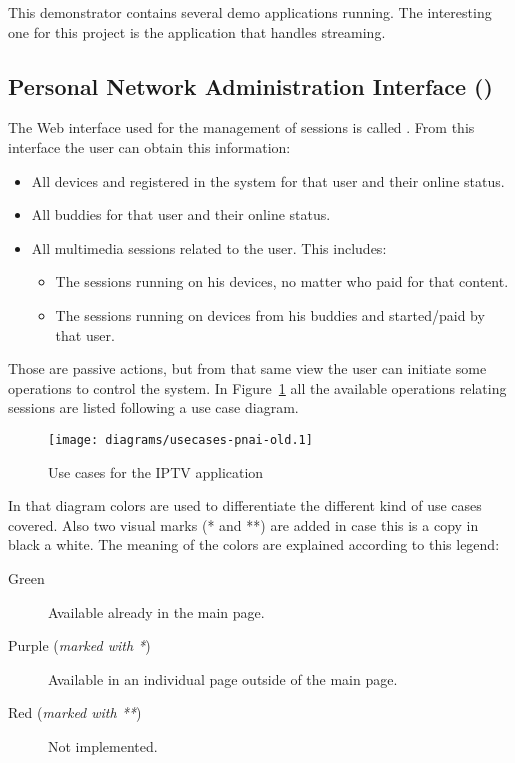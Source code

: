 This demonstrator contains several demo applications running.
The interesting one for this project is the application that handles  streaming.


\subsection{Personal Network Administration Interface ()} %
\label{sub:pnai}

The Web interface used for the management of sessions is called . From this interface the user can obtain this information:

\begin{itemize}
  \item All devices and registered in the system for that user and their online status.
  \item All buddies for that user and their online status.
  \item All multimedia sessions related to the user. This includes:
  \begin{itemize}
    \item The sessions running on his devices, no matter who paid for that content.
    \item The sessions running on devices from his buddies and started/paid by that user.
  \end{itemize}
\end{itemize}

Those are passive actions, but from that same view the user can initiate some operations to control the system.
In Figure~\ref{fig:usecasesiptv} all the available operations relating sessions are listed following a use case diagram.

\begin{figure}[htbp]
  \centering
    \texttt{[image: diagrams/usecases-pnai-old.1]}
  \caption{Use cases for the IPTV application}
  \label{fig:usecasesiptv}
\end{figure}

In that diagram colors are used to differentiate the different kind of use cases covered. Also two visual marks (* and **) are added in case this is a copy in black a white. The meaning of the colors are explained according to this legend:

\begin{description}
  \item[Green] Available already in the main  page.
  \item[Purple (\emph{marked with *})] Available in an individual page outside of the main  page.
  \item[Red (\emph{marked with **})] Not implemented.
\end{description}

